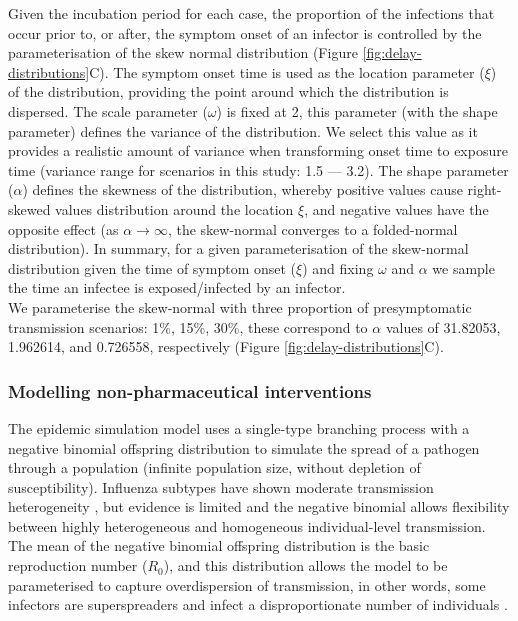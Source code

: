 \documentclass{article}
\begin{document}
Given the incubation period for each case, the proportion of the infections that occur prior to, or after, the symptom onset of an infector is controlled by the parameterisation of the skew normal distribution (Figure \ref{fig:delay-distributions}C). The symptom onset time is used as the location parameter ($\xi$) of the distribution, providing the point around which the distribution is dispersed. The scale parameter ($\omega$) is fixed at 2, this parameter (with the shape parameter) defines the variance of the distribution. We select this value as it provides a realistic amount of variance when transforming onset time to exposure time (variance range for scenarios in this study: 1.5 --- 3.2). The shape parameter ($\alpha$) defines the skewness of the distribution, whereby positive values cause right-skewed values distribution around the location $\xi$, and negative values have the opposite effect (as $\alpha \rightarrow \infty$, the skew-normal converges to a folded-normal distribution). In summary, for a given parameterisation of the skew-normal distribution given the time of symptom onset ($\xi$) and fixing $\omega$ and $\alpha$ we sample the time an infectee is exposed/infected by an infector. \\

We parameterise the skew-normal with three proportion of presymptomatic transmission scenarios: 1\%, 15\%, 30\%, these correspond to $\alpha$ values of 31.82053, 1.962614, and 0.726558, respectively (Figure \ref{fig:delay-distributions}C).

\subsubsection*{Modelling non-pharmaceutical interventions}

The epidemic simulation model uses a single-type branching process with a negative binomial offspring distribution to simulate the spread of a pathogen through a population (infinite population size, without depletion of susceptibility). Influenza subtypes have shown moderate transmission heterogeneity \citep{fraserPandemicPotentialStrain2009, heComparingCOVID191918192020, Ward2024.12.11.24318702}, but evidence is limited and the negative binomial allows flexibility between highly heterogeneous and homogeneous individual-level transmission. The mean of the negative binomial offspring distribution is the basic reproduction number ($R_0$), and this distribution allows the model to be parameterised to capture overdispersion of transmission, in other words, some infectors are superspreaders and infect a disproportionate number of individuals \citep{lloyd-smithSuperspreadingEffectIndividual2005, kucharskiEarlyDynamicsTransmission2020}. \\
\end{document}
